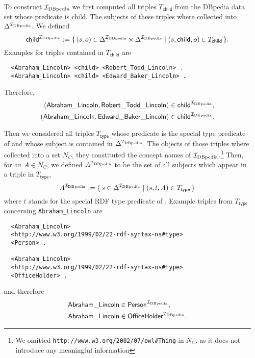 To construct ${\mathcal{I}_{\text{DBpedia}}}$ we first computed all triples $T_{\mathsf{child}}$ from the
DBpedia data set whose predicate is \textsf{child}.  The subjects of these triples where
collected into $\Delta^{{\mathcal{I}_{\text{DBpedia}}}}$.  We defined
\begin{equation*}
  \mathsf{child}^{{\mathcal{I}_{\text{DBpedia}}}} := {\{\, (s, o) \in \Delta^{\mathcal{I}_{\text{DBpedia}}} \times \Delta^{\mathcal{I}_{\text{DBpedia}}}
    \mid (s, \mathsf{child}, o) \in T_{\mathsf{child}} \,\}}.
\end{equation*}
Examples for triples contained in $T_{\mathsf{child}}$ are
\begin{verbatim}
  <Abraham_Lincoln> <child> <Robert_Todd_Lincoln> .
  <Abraham_Lincoln> <child> <Edward_Baker_Lincoln> .
\end{verbatim}
Therefore,
\begin{align*}
  (\mathsf{Abraham\_Lincoln}, \mathsf{Robert\_Todd\_Lincoln}) &\in \mathsf{child}^{{\mathcal{I}_{\text{DBpedia}}}},\\
  (\mathsf{Abraham\_Lincoln}, \mathsf{Edward\_Baker\_Lincoln}) &\in \mathsf{child}^{{\mathcal{I}_{\text{DBpedia}}}}.
\end{align*}

Then we considered all triples $T_{\mathsf{type}}$ whose predicate is the special type
predicate of  and whose subject is contained in $\Delta^{{\mathcal{I}_{\text{DBpedia}}}}$.  The
objects of those triples where collected into a set $N_C$, \ie they constituted the
concept names of ${\mathcal{I}_{\text{DBpedia}}}$.\footnote{We omitted
  \texttt{http://www.w3.org/2002/07/owl\#Thing} in $N_C$, as it does not introduce any
  meaningful information} Then, for an $A \in N_C$, we defined $A^{{\mathcal{I}_{\text{DBpedia}}}}$ to be the
set of all subjects which appear in a triple in $T_{\mathsf{type}}$, \ie
\begin{equation*}
  A^{{\mathcal{I}_{\text{DBpedia}}}} := {\{\, s \in \Delta^{{\mathcal{I}_{\text{DBpedia}}}} \mid (s, t, A) \in
    T_{\mathsf{type}} \,\}}
\end{equation*}
where $t$ stands for the special RDF type predicate of .  Example triples from
$T_{\mathsf{type}}$ concerning \verb|Abraham_Lincoln| are
\begin{verbatim}
  <Abraham_Lincoln>
  <http://www.w3.org/1999/02/22-rdf-syntax-ns#type>
  <Person> .

  <Abraham_Lincoln>
  <http://www.w3.org/1999/02/22-rdf-syntax-ns#type>
  <OfficeHolder> .
\end{verbatim}
and therefore
\begin{align*}
  \mathsf{Abraham\_Lincoln} &\in \mathsf{Person}^{{\mathcal{I}_{\text{DBpedia}}}}, \\
  \mathsf{Abraham\_Lincoln} &\in \mathsf{OfficeHolder}^{{\mathcal{I}_{\text{DBpedia}}}}.
\end{align*}

